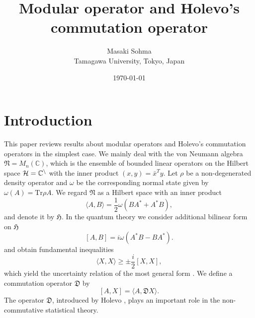 \documentclass{article}
\begin{document}
\title{Modular operator and Holevo's commutation operator}


 \author{Masaki Sohma
\\
Tamagawa University, Tokyo, Japan}


\date{\today}



\maketitle




\section{Introduction}
This paper reviews results about  modular operators \cite{Longo_1978} and  Holevo's commutation operators \cite{Holevo_1977} in the simplest case.
We mainly deal with the von Neumann algebra $\mathfrak{N}=M_n(\mathbb{C})$, 
which is the ensemble of bounded linear operators on 
the Hilbert space $\cal{H}=\mathbb{C}^n$ with the inner product $(x,y)=\bar{x}^Ty$. 
Let $\rho$ be a non-degenerated density operator and 
$\omega$ be the corresponding normal state given by $\omega(A)=\mbox{Tr}\rho A$.
We regard $\mathfrak{N}$ as a Hilbert space with an inner product
\begin{equation}
\label{innerP}
\langle A, B \rangle =\frac{1}{2}\omega(BA^{\ast}+A^{\ast}B),
\end{equation}
and denote it by $\mathfrak{H}$.
In the quantum theory we consider additional bilinear form on $\mathfrak{H}$ 
\begin{equation}\label{Bform}
[A,B]=i\omega(A^{\ast}B-BA^{\ast}).
\end{equation}
and  obtain fundamental inequalities 
$$
\langle X, X\rangle \geq \pm \frac{i}{2}[X,X],
$$
which yield  the uncertainty relation of the most general form \cite{Holevo_1977}.
We define a commutation operator $\mathfrak{D}$ by 
\begin{equation}\label{Copr}
[A,X]=\langle A, \mathfrak{D}X\rangle.
\end{equation}
The operator $\mathfrak{D}$, introduced by Holevo \cite{Holevo_1977}, plays an important role in the non-commutative statistical theory.  
\end{document}
